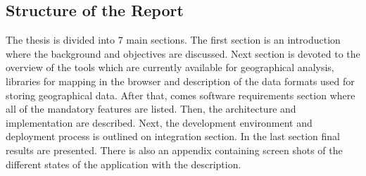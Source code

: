 \subsection{Structure of the Report}

The thesis is divided into 7 main sections. The first section is an introduction where the
background and objectives are discussed. Next section is devoted to the overview of the tools which
are currently available for geographical analysis, libraries for mapping in the browser and
description of the data formats used for storing geographical data. After that, comes software
requirements section where all of the mandatory features are listed. Then, the architecture and
implementation are described. Next, the development environment and deployment process is outlined on
integration section. In the last section final results are presented. There is also an appendix
containing screen shots of the different states of the application with the description.
